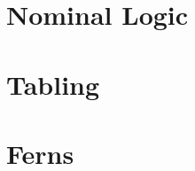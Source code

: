 \documentclass[onecolumn, 11pt, oneside, openright]{book}
\begin{document}




\part{Nominal Logic}\label{nominallogicpart}








\part{Tabling}\label{tablingpart}






\part{Ferns}\label{fernspart}
\end{document}
